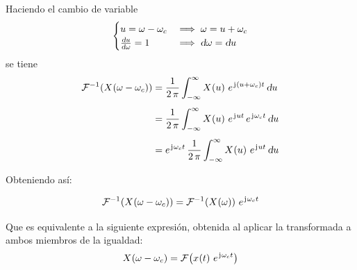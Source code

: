 Haciendo el cambio de variable
\[
    \begin{cases}
        u = \omega - \omega_c & \implies \omega = u + \omega_c
        \\
        \deriv[u]{\omega} = 1 & \implies \dif \omega = \dif u
    \end{cases}
\]
se tiene
\begin{align*}
    \ffourier{\fx[X]{\omega - \omega_c}}
    & = \frac{1}{2 \, \pi} \int_{-\infty}^\infty \fx[X]{u} \, e^{\iu (u + \omega_c) t} \, \dif u
    \\[1ex]
    & = \frac{1}{2 \, \pi} \int_{-\infty}^\infty \fx[X]{u} \, e^{\iu u t} \, e^{\iu \omega_c t} \, \dif u
    \\[1ex]
    & =  e^{\iu \omega_c t} \, \frac{1}{2 \, \pi} \int_{-\infty}^\infty \fx[X]{u} \, e^{\iu u t} \, \dif u
\end{align*}

Obteniendo así:

\begin{mdframed}[style=PropertyFrame]
    \begin{prop}
    \end{prop}
    \[
        \ffourier{\fx[X]{\omega - \omega_c}} = \ffourier{\fx[X]{\omega}} \, e^{\iu \omega_c t}
    \]
\end{mdframed}

Que es equivalente a la siguiente expresión, obtenida al aplicar la transformada a ambos miembros de la igualdad:
\[
    \fx[X]{\omega - \omega_c} = \fourier{\fx[x]{t} \, e^{\iu \omega_c t}}
\]

